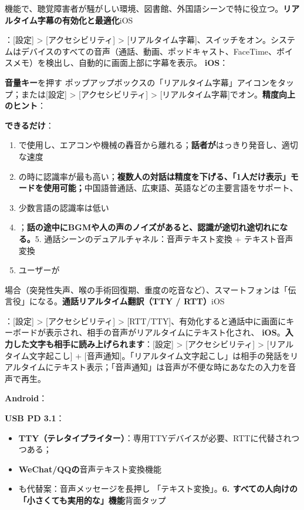 
機能で、聴覚障害者が騒がしい環境、図書館、外国語シーンで特に役立つ。\textbf{リアルタイム字幕の有効化と最適化}iOS

\begin{tcbinfo}{：[設定] > [アクセシビリティ] > [リアルタイム字幕]、スイッチをオン。システムはデバイスのすべての音声（通話、動画、ポッドキャスト、FaceTime、ボイスメモ）を検出し、自動的に画面上部に字幕を表示。}
\textbf{iOS}：

\textbf{音量キー}を押す ポップアップボックスの「リアルタイム字幕」アイコンをタップ；または[設定] > [アクセシビリティ] > [リアルタイム字幕]でオン。\textbf{精度向上のヒント}：

\textbf{できるだけ}：

\begin{enumerate}
  \item で使用し、エアコンや機械の轟音から離れる；\textbf{話者が}はっきり発音し、適切な速度
  \item の時に認識率が最も高い；\textbf{複数人の対話は精度を下げる、「1人だけ表示」モードを使用可能；}中国語普通話、広東語、英語などの主要言語をサポート、
  \item 少数言語の認識率は低い
  \item ；\textbf{話の途中にBGMや人の声のノイズがあると、認識が途切れ途切れになる。}5. 通話シーンのデュアルチャネル：音声テキスト変換 + テキスト音声変換
  \item ユーザーが
\end{enumerate}

\end{tcbinfo}


場合（突発性失声、喉の手術回復期、重度の吃音など）、スマートフォンは「伝言役」になる。\textbf{通話リアルタイム翻訳（TTY / RTT）}iOS

\begin{tcbinfo}{：[設定] > [アクセシビリティ] > [RTT/TTY]、有効化すると通話中に画面にキーボードが表示され、相手の音声がリアルタイムにテキスト化され、}
\textbf{iOS}。\textbf{入力した文字も相手に読み上げられます}：[設定] > [アクセシビリティ] > [リアルタイム文字起こし] + [音声通知]。「リアルタイム文字起こし」は相手の発話をリアルタイムにテキスト表示；「音声通知」は音声が不便な時にあなたの入力を音声で再生。

\textbf{Android}：

\textbf{USB PD 3.1}：

\begin{itemize}
  \item \textbf{TTY（テレタイプライター）}：専用TTYデバイスが必要、RTTに代替されつつある；
  \item \textbf{WeChat/QQの}音声テキスト変換機能
  \item も代替案：音声メッセージを長押し 「テキスト変換」。\textbf{6. すべての人向けの「小さくても実用的な」機能}背面タップ
\end{itemize}

\end{tcbinfo}

